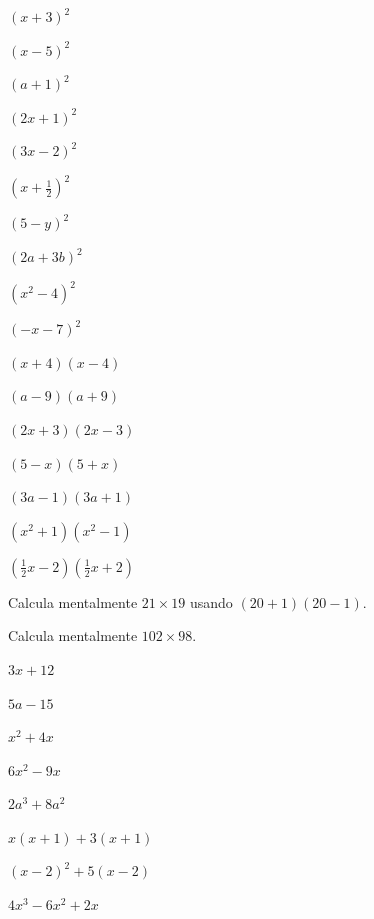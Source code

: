 \documentclass[12pt]{article}
\begin{document}


\begin{exercicios}
  \item $(x + 3)^2$
  \item $(x - 5)^2$
  \item $(a + 1)^2$
  \item $(2x + 1)^2$
  \item $(3x - 2)^2$
  \item $(x + \tfrac{1}{2})^2$
  \item $(5 - y)^2$
  \item $(2a + 3b)^2$
  \item $(x^2 - 4)^2$
  \item $(-x - 7)^2$
\end{exercicios}

\begin{exercicios}
  \item $(x + 4)(x - 4)$
  \item $(a - 9)(a + 9)$
  \item $(2x + 3)(2x - 3)$
  \item $(5 - x)(5 + x)$
  \item $(3a - 1)(3a + 1)$
  \item $(x^2 + 1)(x^2 - 1)$
  \item $\left(\tfrac{1}{2}x - 2\right)\left(\tfrac{1}{2}x + 2\right)$
  \item Calcula mentalmente $21 \times 19$ usando $(20 + 1)(20 - 1)$.
  \item Calcula mentalmente $102 \times 98$.
\end{exercicios}

\begin{exercicios}
  \item $3x + 12$
  \item $5a - 15$
  \item $x^2 + 4x$
  \item $6x^2 - 9x$
  \item $2a^3 + 8a^2$
  \item $x(x + 1) + 3(x + 1)$
  \item $(x - 2)^2 + 5(x - 2)$
  \item $4x^3 - 6x^2 + 2x$
\end{exercicios}
\end{document}
